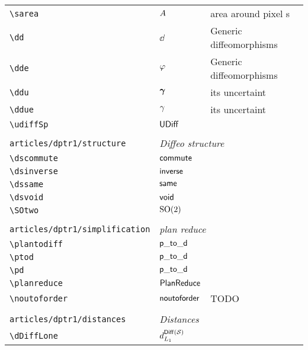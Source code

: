 \begin{longtable}{lll}
 {\color[rgb]{0.5,0.5,0.5}\texttt{\textbackslash sarea}} & $A$ &  area around pixel s\\ 
 {\color[rgb]{0.5,0.5,0.5}\texttt{\textbackslash dd}} & $\dd$ &  Generic diffeomorphisms\\ 
 {\color[rgb]{0.5,0.5,0.5}\texttt{\textbackslash dde}} & $\varphi$ &  Generic diffeomorphisms\\ 
 {\color[rgb]{0.5,0.5,0.5}\texttt{\textbackslash ddu}} & $\boldsymbol{\gamma}$ &  its uncertaint\\ 
 {\color[rgb]{0.5,0.5,0.5}\texttt{\textbackslash ddue}} & $\gamma$ &  its uncertaint\\ 
 {\color[rgb]{0.5,0.5,0.5}\texttt{\textbackslash udiffSp}} & $\mathsf{UDiff}$ & \\ 
  &  & \\ 
 {\color[rgb]{0.5,0.5,0.5}\texttt{articles/dptr1/structure}} & \multicolumn{2}{l}{\emph{Diffeo structure}}\\ 
 \hline
{\color[rgb]{0.5,0.5,0.5}\texttt{\textbackslash dscommute}} & $\mathsf{commute}$ & \\ 
 {\color[rgb]{0.5,0.5,0.5}\texttt{\textbackslash dsinverse}} & $\mathsf{inverse}$ & \\ 
 {\color[rgb]{0.5,0.5,0.5}\texttt{\textbackslash dssame}} & $\mathsf{same}$ & \\ 
 {\color[rgb]{0.5,0.5,0.5}\texttt{\textbackslash dsvoid}} & $\mathsf{void}$ & \\ 
 {\color[rgb]{0.5,0.5,0.5}\texttt{\textbackslash SOtwo}} & $\mathrm{SO}(2)$ & \\ 
  &  & \\ 
 {\color[rgb]{0.5,0.5,0.5}\texttt{articles/dptr1/simplification}} & \multicolumn{2}{l}{\emph{plan reduce}}\\ 
 \hline
{\color[rgb]{0.5,0.5,0.5}\texttt{\textbackslash plantodiff}} & $\mathsf{p\_to\_d}$ & \\ 
 {\color[rgb]{0.5,0.5,0.5}\texttt{\textbackslash ptod}} & $\mathsf{p\_to\_d}$ & \\ 
 {\color[rgb]{0.5,0.5,0.5}\texttt{\textbackslash pd}} & $\mathsf{p\_to\_d}$ & \\ 
 {\color[rgb]{0.5,0.5,0.5}\texttt{\textbackslash planreduce}} & $\mathsf{PlanReduce}$ & \\ 
 {\color[rgb]{0.5,0.5,0.5}\texttt{\textbackslash noutoforder}} & $\mathsf{noutoforder}$ &  TODO\\ 
  &  & \\ 
 {\color[rgb]{0.5,0.5,0.5}\texttt{articles/dptr1/distances}} & \multicolumn{2}{l}{\emph{Distances}}\\ 
 \hline
{\color[rgb]{0.5,0.5,0.5}\texttt{\textbackslash dDiffLone}} & $\dDiffLone$ & \\ 

\end{longtable}
